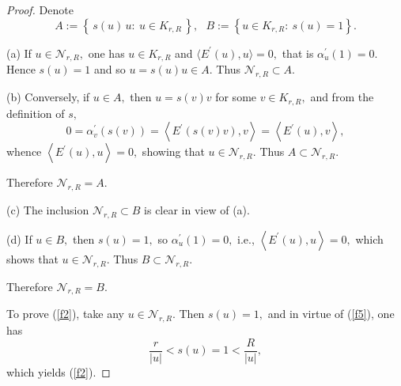 \documentclass[10pt,a4paper]{amsart}
\begin{document}
\begin{proof}
Denote
\begin{equation*}
A:=\left\{ \,s(u)\,u:\ u\in K_{r,R}\,\right\} ,\ \ \ B:=\left\{ u\in
K_{r,R}:\ s\left( u\right) =1\right\} .
\end{equation*}

(a) If $u\in \mathcal{N}_{r,R},$ one has $u\in K_{r,R}$ and $\langle
E^{\prime }(u),u\rangle =0,$ that is $\alpha _{u}^{\prime }\left( 1\right)
=0.$ Hence $s\left( u\right) =1$ and so $u=s\left( u\right) u\in A.$ Thus $%
\mathcal{N}_{r,R}\subset A.$

(b) Conversely, if $u\in A,$ then $u=s\left( v\right) v$ for some $v\in
K_{r,R},$ and from the definition of $s,$
\begin{equation*}
0=\alpha _{v}^{\prime }\left( s\left( v\right) \right) =\left\langle
E^{\prime }\left( s\left( v\right) v\right),v \right\rangle =\left\langle
E^{\prime }\left( u\right) ,v\right\rangle ,
\end{equation*}%
whence $\left\langle E^{\prime }\left( u\right) ,u\right\rangle =0,$ showing
that $u\in \mathcal{N}_{r,R}.$ Thus $A\subset \mathcal{N}_{r,R}.$

Therefore $\mathcal{N}_{r,R}=A.$

(c) The inclusion $\mathcal{N}_{r,R}\subset B$ is clear in view of (a).

(d) If $u\in B,$ then $s\left( u\right) =1,$ so $\alpha _{u}^{\prime }\left(
1\right) =0,$ i.e., $\left\langle E^{\prime }\left( u\right) ,u\right\rangle
=0,$ which shows that $u\in \mathcal{N}_{r,R}.$ Thus $B\subset \mathcal{N}%
_{r,R}.$

Therefore $\mathcal{N}_{r,R}=B.$

To prove (\ref{f2}), take any $u\in \mathcal{N}_{r,R}.$ Then $s\left(
u\right) =1,$ and in virtue of (\ref{f5}), one has
\begin{equation*}
\frac{r}{\left\vert u\right\vert }<s\left( u\right) =1<\frac{R}{\left\vert
u\right\vert },
\end{equation*}%
which yields (\ref{f2}).
\end{proof}
\end{document}

